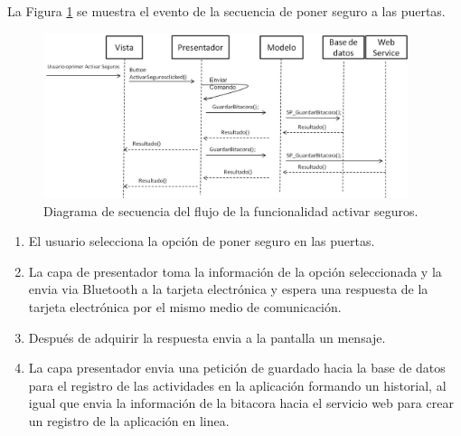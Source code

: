 La Figura \ref{ds6} se muestra el evento de la secuencia de poner seguro a las puertas.\\
\begin{figure}[H]
\centering
\includegraphics[width=0.95\textwidth]{metodologia/DSActivarSeguros.jpg}
\caption{Diagrama de secuencia del flujo de la funcionalidad activar seguros.}
\label{ds6}
\end{figure}
%
 \begin{enumerate}
\item El usuario selecciona la opción de poner seguro en las puertas.
\item La capa de presentador toma la información de la opción seleccionada y la envia via Bluetooth a la tarjeta electrónica y espera una respuesta de la tarjeta electrónica por el mismo medio de comunicación.
\item Después de adquirir la respuesta envia a la pantalla un mensaje.
\item La capa presentador envia una petición de guardado hacia la base de datos para el registro de las actividades en la aplicación formando un historial, al igual que envia la información de la bitacora hacia el servicio web para crear un registro de la aplicación en linea.
\end{enumerate}

